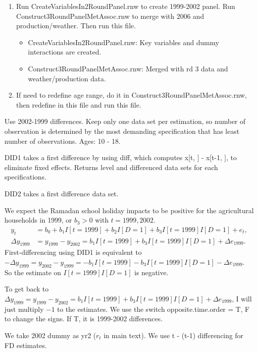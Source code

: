 \begin{enumerate}
\vspace{1.0ex}\setlength{\itemsep}{1.0ex}\setlength{\baselineskip}{12pt}
\item	Run \textsf{CreateVariablesIn2RoundPanel.rnw} to create 1999-2002 panel. Run \textsf{Construct3RoundPanelMetAssoc.rnw} to merge with 2006 and production/weather. Then run this file. 
	\begin{itemize}
	\vspace{1.0ex}\setlength{\itemsep}{1.0ex}\setlength{\baselineskip}{12pt}
	\item	\textsf{CreateVariablesIn2RoundPanel.rnw}: Key variables and dummy interactions are created.
	\item	\textsf{Construct3RoundPanelMetAssoc.rnw}: Merged with rd 3 data and weather/production data.
	\end{itemize}
\item	If need to redefine age range, do it in Construct3RoundPanelMetAssoc.rnw, then redefine in this file and run this file.
\end{enumerate}
Use 2002-1999 differences. Keep only one data set per estimation, so number of observation is determined by the most demanding specification that has least number of observations. Ages: 10 - 18.
\begin{dinglist}{43}
\vspace{1.0ex}\setlength{\itemsep}{1.0ex}\setlength{\baselineskip}{12pt}
\item	\textsf{DID1} takes a first difference by using \textsf{diff}, which computes x[t, ] - x[t-1, ], to eliminate fixed effects. Returns level and differenced data sets for each specifications.
\item	\textsf{DID2} takes a first difference data set. 
\item	We expect the Ramadan school holiday impacts to be positive for the agricultural households in 1999, or $b_{3}>0$ with $t=1999, 2002$. 
\[
\begin{aligned}
y_{t}&=b_{0}+b_{1}I[t=1999]+b_{2}I[D=1]+b_{3}I[t=1999]I[D=1]+e_{t},\\
\Delta y_{1999}&=y_{1999}-y_{2002}=b_{1}I[t=1999]+b_{3}I[t=1999]I[D=1]+\Delta e_{1999}.
\end{aligned}
\]
First-differencing using \textsf{DID1} is equivalent to $-\Delta y_{1999}=y_{2002}-y_{1999}=-b_{1}I[t=1999]-b_{3}I[t=1999]I[D=1]-\Delta e_{1999}$. So the estimate on $I[t=1999]I[D=1]$ is negative.
\item	To get back to $\Delta y_{1999}=y_{1999}-y_{2002}=b_{1}I[t=1999]+b_{3}I[t=1999]I[D=1]+\Delta e_{1999}$, I will just multiply $-1$ to the estimates. We use the switch \textsf{opposite.time.order = T, F}
to change the signs. If T, it is 1999-2002 differences.
\item	We take 2002 dummy as yr2 ($r_{t}$ in main text). We use t - (t-1) differencing for FD estimates. 
\end{dinglist}


